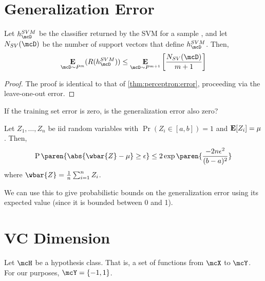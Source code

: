 \section{Generalization Error} \label{sec:svm:generalization}

\begin{theorem}[FOML 5.4] \label{thm:svm:error}
    Let $h_\mcD^{SVM}$ be the classifier returned by the SVM for a sample
    \mcD{}, and let $N_{SV}(\mcD)$ be the number of support vectors that
    define $h_\mcD^{SVM}$.
    Then, \[
        \E_{\mcD \sim P^m}(R(h_\mcD^{SVM}))
            \le \E_{\mcD \sim P^{m+1}}\left[\frac{N_{SV}(\mcD)}{m+1}\right]
    \]
\end{theorem}
\begin{proof}
    The proof is identical to that of \cref{thm:perceptron:error},
    proceeding via the leave-one-out error.
\end{proof}

If the training set error is zero, is the generalization error also zero?
\begin{fact}
    Let $Z_1, \dots, Z_n$ be iid random variables with
    $\Pr(Z_i \in [a, b]) = 1$ and $\operatorname*{\textbf{E}}[Z_i] = \mu$.
    Then, \[
        \Pr\paren{\abs{\wbar{Z} - \mu} \ge \epsilon}
            \le 2\exp\paren{\frac{-2n\epsilon^2}{(b-a)^2}}
    \] where $\wbar{Z} = \frac{1}{n}\sum_{i=1}^n Z_i$.
\end{fact}
We can use this to give probabilistic bounds on the generalization error
using its expected value (since it is bounded between 0 and 1).

\section{VC Dimension} \label{sec:svm:vc}
Let $\mcH$ be a hypothesis class.
That is, a set of functions from $\mcX$ to $\mcY$.
For our purposes, $\mcY = \pms$.

